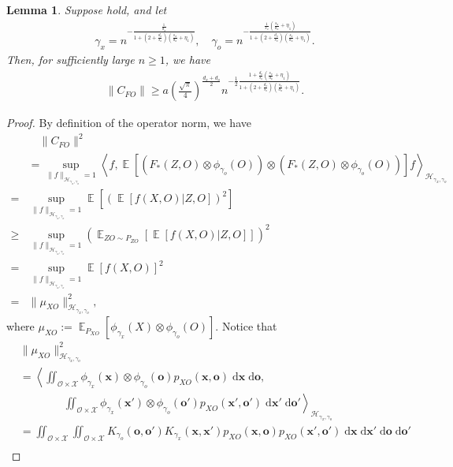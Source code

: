 \documentclass[11pt]{article}
\newcommand{\bx}{\mathbf x}
\newcommand{\bo}{\mathbf o}
\newcommand{\calH}{\mathcal{H}}
\newcommand{\calO}{\mathcal{O}}
\newcommand{\calX}{\mathcal{X}}
\newcommand{\0}{\mathbf{0}}
\DeclareMathOperator{\E}{\mathbb{E}}
\newtheorem{lem}{Lemma}[section]
\begin{document}
\begin{appendix}
\begin{lem}
\label{lem: C_f_op_norm_lower_bound}
Suppose  hold, and let
\begin{align*}
    \gamma_x = n^{-\frac{\frac{1}{d_x}}{1+(2+\frac{d_o}{s_o})(\frac{s_x}{d_x}+\eta_1)}}, \quad \gamma_o = n^{-\frac{\frac{1}{s_o}(\frac{s_x}{d_x}+\eta_1)}{1+(2+\frac{d_o}{s_o})(\frac{s_x}{d_x}+\eta_1)}}.
\end{align*}
Then, for sufficiently large $n\geq 1$, we have 
\begin{align*}
    \|C_{FO}\| \geq a\left(\frac{\sqrt{\pi}}{4}\right)^{\frac{d_x+d_o}{2}} n^{-\frac{1}{2}\frac{1+\frac{d_o}{s_o}(\frac{s_x}{d_x}+\eta_1)}{1+(2+\frac{d_o}{s_o})(\frac{s_x}{d_x}+\eta_1)}} .
\end{align*}
\end{lem}
\begin{proof}
By definition of the operator norm, we have
\begin{align*}
    &\quad \|C_{FO}\|^2 \\
    &= \sup_{\|f\|_{\calH_{\gamma_x,\gamma_o}} = 1}\left\langle f, \E[(F_{\ast}(Z, O) \otimes \phi_{\gamma_o}(O))\otimes (F_{\ast}(Z, O) \otimes \phi_{\gamma_o}(O))]f\right\rangle_{\calH_{\gamma_x,\gamma_o}}\\ 
    =& \sup_{\|f\|_{\calH_{\gamma_x,\gamma_o}} = 1} \E \left[ \left(\E[f(X,O)|Z,O] \right)^2 \right]\\
    \geq & \sup_{\|f\|_{\calH_{\gamma_x,\gamma_o}} = 1} \left( \E_{ZO \sim P_{ZO}} \left[\E[f(X,O)|Z,O]\right] \right)^2\\
    =&  \sup_{\|f\|_{\calH_{\gamma_x,\gamma_o}} = 1} \E[f(X,O)]^2 \\
    =& \|\mu_{XO}\|_{\calH_{\gamma_x,\gamma_o}}^2 , 
\end{align*}
where $\mu_{XO} := \E_{P_{XO}}[\phi_{\gamma_x}(X) \otimes \phi_{\gamma_o}(O)]$. 
Notice that 
\begin{align*}
    &\|\mu_{XO} \|_{\calH_{\gamma_x,\gamma_o}}^2\\ &= \left\langle \iint_{\calO\times\calX} \phi_{\gamma_x}(\bx) \otimes \phi_{\gamma_o}(\bo) p_{XO}(\bx,\bo)\;\mathrm{d}\bx \;\mathrm{d}\bo, \right. \\
    &\qquad\qquad \left. \iint_{\calO\times\calX} \phi_{\gamma_x}(\bx') \otimes \phi_{\gamma_o}(\bo') p_{XO}(\bx',\bo')\;\mathrm{d}\bx'\;\mathrm{d}\bo'\right\rangle_{\calH_{\gamma_x,\gamma_o}}\\
    &= \iint_{\calO\times\calX} \iint_{\calO\times\calX} K_{\gamma_o}(\bo,\bo') K_{\gamma_x}(\bx,\bx')p_{XO}(\bx,\bo) p_{XO}(\bx', \bo')\;\mathrm{d}\bx\;\mathrm{d}\bx'\;\mathrm{d}\bo\;\mathrm{d}\bo'\\

\end{align*}
\end{proof}
\end{appendix}
\end{document}
